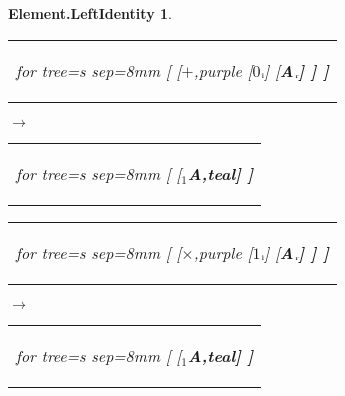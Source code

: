 \documentclass[UTF8,10pt]{ctexart}
\newcommand{\Bigskip}{\bigskip\medskip}
\newcommand{\subtreeA}{\bf A}
\newcommand{\I}{$_{\scriptscriptstyle 1}$}
\newcommand{\lc}{$_{\:\!\scriptscriptstyle\rm l\!}$}
\newcommand{\rc}{$_{\:\!\scriptscriptstyle\rm r\!}$}
\newcommand{\Zero}{$0$}
\newcommand{\One}{$1$}
\newcommand{\Addition}{$+$}
\newcommand{\Multiplication}{$\times$}
\newtheorem*{Element.LeftIdentity}{\bf Element.LeftIdentity }
\begin{document}
	\begin{center}\vspace*{\fill}
		\begin{Element.LeftIdentity}
			\qquad\par\Bigskip
			\begin{tabular}{c}
				\begin{forest}
					for tree={s sep=8mm}
					[
						[\Addition,purple
							[\Zero\lc]
							[\subtreeA\rc]
						]
					]
				\end{forest}
			\end{tabular}
			\qquad
			$\longrightarrow$
			\qquad
			\begin{tabular}{c}
				\begin{forest}
					for tree={s sep=8mm}
					[
						[\I\subtreeA,teal]
					]
				\end{forest}
			\end{tabular}
			\par\bigskip
			\begin{tabular}{c}
				\begin{forest}
					for tree={s sep=8mm}
					[
						[\Multiplication,purple
							[\One\lc]
							[\subtreeA\rc]
						]
					]
				\end{forest}
			\end{tabular}
			\qquad
			$\longrightarrow$
			\qquad
			\begin{tabular}{c}
				\begin{forest}
					for tree={s sep=8mm}
					[
						[\I\subtreeA,teal]
					]
				\end{forest}
			\end{tabular}
		\end{Element.LeftIdentity}
	\vspace*{\fill}\end{center}

	\newpage
\end{document}
